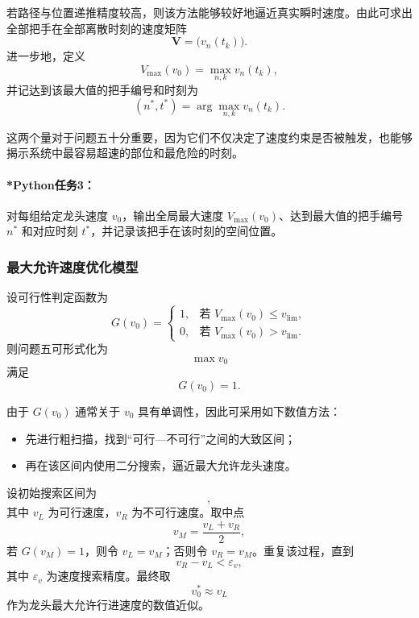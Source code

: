 \documentclass[12pt,a4paper]{ctexart}
\begin{document}
若路径与位置递推精度较高，则该方法能够较好地逼近真实瞬时速度。由此可求出全部把手在全部离散时刻的速度矩阵
\begin{equation}
\bm{V}=\bigl(v_n(t_k)\bigr).
\end{equation}
进一步地，定义
\begin{equation}
V_{\max}(v_0)=\max_{n,k} v_n(t_k),
\end{equation}
并记达到该最大值的把手编号和时刻为
\begin{equation}
(n^\ast,t^\ast)=\arg\max_{n,k} v_n(t_k).
\end{equation}

这两个量对于问题五十分重要，因为它们不仅决定了速度约束是否被触发，也能够揭示系统中最容易超速的部位和最危险的时刻。

\paragraph{*Python任务3：}
对每组给定龙头速度 $v_0$，输出全局最大速度 $V_{\max}(v_0)$、达到最大值的把手编号 $n^\ast$ 和对应时刻 $t^\ast$，并记录该把手在该时刻的空间位置。

\subsubsection{最大允许速度优化模型}
设可行性判定函数为
\begin{equation}
G(v_0)=
\begin{cases}
1, & \text{若 } V_{\max}(v_0)\le v_{\mathrm{lim}},\\
0, & \text{若 } V_{\max}(v_0)>v_{\mathrm{lim}}.
\end{cases}
\end{equation}
则问题五可形式化为
\begin{equation}
\max v_0
\end{equation}
满足
\begin{equation}
G(v_0)=1.
\end{equation}

由于 $G(v_0)$ 通常关于 $v_0$ 具有单调性，因此可采用如下数值方法：

\begin{itemize}
    \item 先进行粗扫描，找到“可行—不可行”之间的大致区间；
    \item 再在该区间内使用二分搜索，逼近最大允许龙头速度。
\end{itemize}

设初始搜索区间为
\begin{equation}
[v_L,v_R],
\end{equation}
其中 $v_L$ 为可行速度，$v_R$ 为不可行速度。取中点
\begin{equation}
v_M=\frac{v_L+v_R}{2},
\end{equation}
若 $G(v_M)=1$，则令 $v_L=v_M$；否则令 $v_R=v_M$。重复该过程，直到
\begin{equation}
v_R-v_L<\varepsilon_v,
\end{equation}
其中 $\varepsilon_v$ 为速度搜索精度。最终取
\begin{equation}
v_0^\ast\approx v_L
\end{equation}
作为龙头最大允许行进速度的数值近似。
\end{document}
